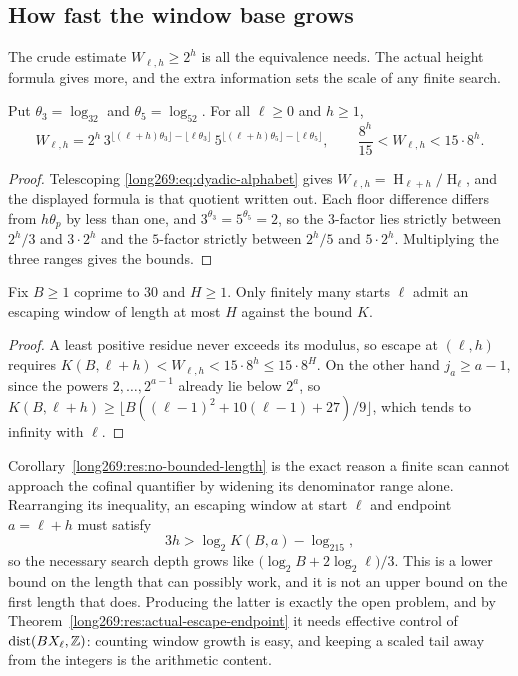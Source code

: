 \documentclass[11pt]{article}
\newcommand{\hgt}{\operatorname{H}}
\begin{document}
\subsection{How fast the window base grows}

The crude estimate $W_{\ell,h}\ge2^{h}$ is all the equivalence needs.  The
actual height formula gives more, and the extra information sets the scale of
any finite search.

\begin{proposition}\label{long269:res:window-growth}
Put $\theta_3=\log_32$ and $\theta_5=\log_52$.  For all $\ell\ge0$ and
$h\ge1$,
\[
 W_{\ell,h}=2^{h}\,
 3^{\lfloor(\ell+h)\theta_3\rfloor-\lfloor\ell\theta_3\rfloor}\,
 5^{\lfloor(\ell+h)\theta_5\rfloor-\lfloor\ell\theta_5\rfloor},
 \qquad
 \frac{8^{h}}{15}<W_{\ell,h}<15\cdot8^{h} .
\]
\end{proposition}

\begin{proof}
Telescoping \eqref{long269:eq:dyadic-alphabet} gives
$W_{\ell,h}=\hgt_{\ell+h}/\hgt_\ell$, and the displayed formula is that
quotient written out.  Each floor difference differs from $h\theta_p$ by less
than one, and $3^{\theta_3}=5^{\theta_5}=2$, so the $3$-factor lies strictly
between $2^{h}/3$ and $3\cdot2^{h}$ and the $5$-factor strictly between
$2^{h}/5$ and $5\cdot2^{h}$.  Multiplying the three ranges gives the bounds.
\end{proof}

\begin{corollary}\label{long269:res:no-bounded-length}
Fix $B\ge1$ coprime to $30$ and $H\ge1$.  Only finitely many starts $\ell$
admit an escaping window of length at most $H$ against the bound $K$.
\end{corollary}

\begin{proof}
A least positive residue never exceeds its modulus, so escape at $(\ell,h)$
requires $K(B,\ell+h)<W_{\ell,h}<15\cdot8^{h}\le15\cdot8^{H}$.  On the other
hand $j_a\ge a-1$, since the powers $2,\ldots,2^{a-1}$ already lie below
$2^{a}$, so $K(B,\ell+h)\ge\lfloor B((\ell-1)^{2}+10(\ell-1)+27)/9\rfloor$,
which tends to infinity with $\ell$.
\end{proof}

\noindent Corollary~\ref{long269:res:no-bounded-length} is the exact reason a finite
scan cannot approach the cofinal quantifier by widening its denominator range
alone.  Rearranging its inequality, an escaping window at start $\ell$ and
endpoint $a=\ell+h$ must satisfy
\[
 3h>\log_2K(B,a)-\log_215,
\]
so the necessary search depth grows like
$\bigl(\log_2B+2\log_2\ell\bigr)/3$.  This is a lower bound on the length that can
possibly work, and it is not an upper bound on the first length that does.
Producing the latter is exactly the open problem, and by
Theorem~\ref{long269:res:actual-escape-endpoint} it needs effective control of
$\operatorname{dist}(BX_\ell,\mathbb{Z})$: counting window growth is easy, and keeping
a scaled tail away from the integers is the arithmetic content.
\end{document}
